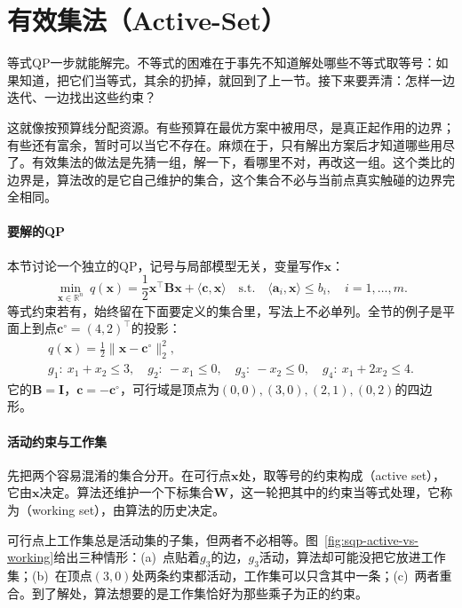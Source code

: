 \section{有效集法（Active-Set）}
\label{sec:sqp-active-set}

等式QP一步就能解完。不等式的困难在于事先不知道解处哪些不等式取等号：如果知道，把它们当等式，其余的扔掉，就回到了上一节。接下来要弄清：怎样一边迭代、一边找出这些约束？

这就像按预算线分配资源。有些预算在最优方案中被用尽，是真正起作用的边界；有些还有富余，暂时可以当它不存在。麻烦在于，只有解出方案后才知道哪些用尽了。有效集法的做法是先猜一组，解一下，看哪里不对，再改这一组。这个类比的边界是，算法改的是它自己维护的集合，这个集合不必与当前点真实触碰的边界完全相同。

\paragraph{要解的QP}
本节讨论一个独立的QP，记号与局部模型无关，变量写作$\bm{x}$：
\begin{equation}
 \min_{\bm{x}\in\mathbb{R}^n}\ q(\bm{x})=\frac12\bm{x}^\top\bm{B}\bm{x}+\langle\bm{c},\bm{x}\rangle
 \quad\text{s.t.}\quad\langle\bm{a}_i,\bm{x}\rangle\leq b_i,\quad i=1,\ldots,m.
 \label{eq:sqp-as-qp}
\end{equation}
等式约束若有，始终留在下面要定义的集合里，写法上不必单列。全节的例子是平面上到点$\bm{c}^\circ=(4,2)^\top$的投影：
\begin{equation}
 \begin{gathered}
 q(\bm{x})=\frac12\lVert\bm{x}-\bm{c}^\circ\rVert_2^2,\\
 g_1:\ x_1+x_2\leq3,\quad g_2:\ -x_1\leq0,\quad g_3:\ -x_2\leq0,\quad g_4:\ x_1+2x_2\leq4.
 \end{gathered}
 \label{eq:sqp-as-example}
\end{equation}
它的$\bm{B}=\bm{I}$，$\bm{c}=-\bm{c}^\circ$，可行域是顶点为$(0,0),(3,0),(2,1),(0,2)$的四边形。

\paragraph{活动约束与工作集}
先把两个容易混淆的集合分开。在可行点$\bm{x}$处，取等号的约束构成（active set），它由$\bm{x}$决定。算法还维护一个下标集合$\bm{W}$，这一轮把其中的约束当等式处理，它称为（working set），由算法的历史决定。

可行点上工作集总是活动集的子集，但两者不必相等。图~\ref{fig:sqp-active-vs-working}给出三种情形：(a)~点贴着$g_3$的边，$g_3$活动，算法却可能没把它放进工作集；(b)~在顶点$(3,0)$处两条约束都活动，工作集可以只含其中一条；(c)~两者重合。到了解处，算法想要的是工作集恰好为那些乘子为正的约束。

